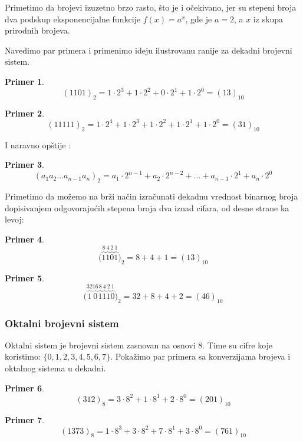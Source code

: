 \documentclass[a4paper]{article}
\newtheorem{primer}{Primer}[section]
\begin{document}
Primetimo da brojevi izuzetno brzo rasto, što je i očekivano, jer su stepeni broja dva podskup eksponencijalne funkcije $f(x)=a^x$, gde je $a=2$, a $x$ iz skupa prirodnih brojeva. 

Navedimo par primera i primenimo ideju ilustrovanu ranije za dekadni brojevni sistem.

\begin{primer}
 $$ (1101)_2 = 1\cdot2^3 + 1\cdot2^2 + 0\cdot2^1 +  1\cdot2^0 
	     = (13)_{10}$$
\end{primer}

\begin{primer}
  $$ (11111)_2 = 1\cdot2^4 + 1\cdot2^3 + 1\cdot2^2 + 1\cdot2^1 +  1\cdot2^0 
	     = (31)_{10}$$
\end{primer}

I naravno opštije :
\begin{primer}
  $$(a_1a_2...a_{n-1}a_n)_2 = a_1\cdot2^{n-1}+a_2\cdot2^{n-2}+...+a_{n-1}\cdot2^{1}+a_n\cdot2^0$$
\end{primer}

Primetimo da možemo na brži način izračunati dekadnu vrednost binarnog broja dopisivanjem odgovorajućih stepena broja dva iznad cifara, od desne strane ka levoj:
\begin{primer}
 $$ \big(\overbrace{1}^{8}\overbrace{1}^{4}\overbrace{0}^{2}\overbrace{1}^{1}\big)_2 = 8 + 4 + 1 = (13)_{10} $$
\end{primer}

\begin{primer}
 $$ \big(\overbrace{1}^{32}\overbrace{0}^{16}\overbrace{1}^{8}\overbrace{1}^{4}\overbrace{1}^{2}\overbrace{0}^{1}\big)_2 = 32 + 8 + 4 + 2 = (46)_{10}$$
\end{primer}

\subsubsection{Oktalni brojevni sistem}
Oktalni sistem je brojevni sistem zasnovan na osnovi 8. Time su cifre koje koristimo: $ \{ 0, 1, 2, 3, 4, 5, 6, 7 \} $. Pokažimo par primera sa konverzijama brojeva i oktalnog sistema u dekadni.

\begin{primer}
 $$ (312)_8 = 3\cdot8^2 + 1\cdot8^1 + 2\cdot8^0 = (201)_{10}$$
\end{primer}

\begin{primer}
 $$ (1373)_8 = 1\cdot8^3+3\cdot8^2+7\cdot8^1+3\cdot8^0 = (761)_{10}$$
\end{primer}
\end{document}
